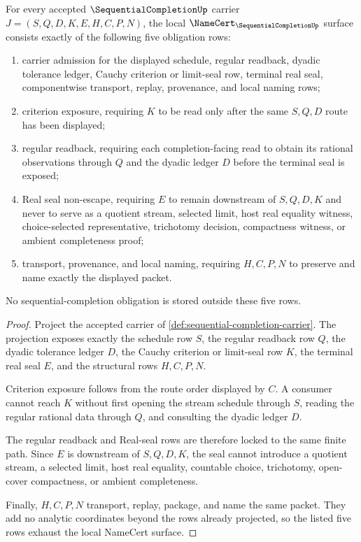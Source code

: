 \begin{theorem}
\label{thm:sequential-completion-namecert-obligations}
For every accepted $\SequentialCompletionUp$ carrier $J=(S,Q,D,K,E,H,C,P,N)$, the local $\NameCert_{\SequentialCompletionUp}$ surface consists exactly of the following five obligation rows:
\begin{enumerate}
\item carrier admission for the displayed schedule, regular readback, dyadic tolerance ledger, Cauchy criterion or limit-seal row, terminal real seal, componentwise transport, replay, provenance, and local naming rows;
\item criterion exposure, requiring $K$ to be read only after the same $S,Q,D$ route has been displayed;
\item regular readback, requiring each completion-facing read to obtain its rational observations through $Q$ and the dyadic ledger $D$ before the terminal seal is exposed;
\item Real seal non-escape, requiring $E$ to remain downstream of $S,Q,D,K$ and never to serve as a quotient stream, selected limit, host real equality witness, choice-selected representative, trichotomy decision, compactness witness, or ambient completeness proof;
\item transport, provenance, and local naming, requiring $H,C,P,N$ to preserve and name exactly the displayed packet.
\end{enumerate}
No sequential-completion obligation is stored outside these five rows.
\end{theorem}
\begin{proof}
Project the accepted carrier of \autoref{def:sequential-completion-carrier}. The projection exposes exactly the schedule row $S$, the regular readback row $Q$, the dyadic tolerance ledger $D$, the Cauchy criterion or limit-seal row $K$, the terminal real seal $E$, and the structural rows $H,C,P,N$.

Criterion exposure follows from the route order displayed by $C$. A consumer cannot reach $K$ without first opening the stream schedule through $S$, reading the regular rational data through $Q$, and consulting the dyadic ledger $D$.

The regular readback and Real-seal rows are therefore locked to the same finite path. Since $E$ is downstream of $S,Q,D,K$, the seal cannot introduce a quotient stream, a selected limit, host real equality, countable choice, trichotomy, open-cover compactness, or ambient completeness.

Finally, $H,C,P,N$ transport, replay, package, and name the same packet. They add no analytic coordinates beyond the rows already projected, so the listed five rows exhaust the local NameCert surface.
\end{proof}

